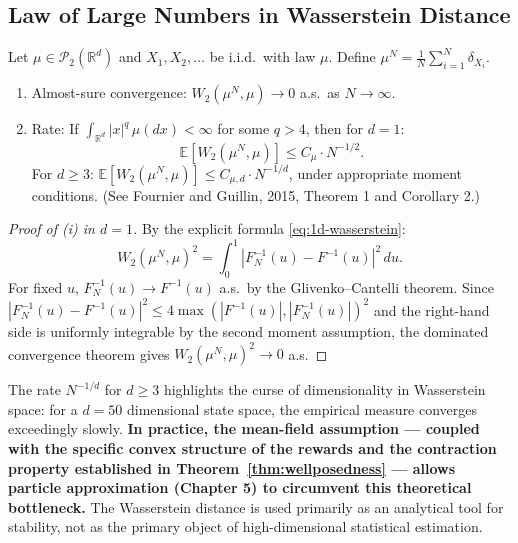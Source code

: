 \subsection{Law of Large Numbers in Wasserstein Distance}

\begin{theorem}
\label{thm:fournier-guillin}
Let $\mu \in \mathcal{P}_2(\mathbb{R}^d)$ and $X_1, X_2, \dots$ be i.i.d.\ with law
$\mu$. Define $\mu^N = \frac{1}{N}\sum_{i=1}^N \delta_{X_i}$.
\begin{enumerate}[label=(\roman*)]
    \item Almost-sure convergence: $W_2(\mu^N, \mu) \to 0$ a.s.\ as $N \to \infty$.
    \item Rate: If $\int_{\mathbb{R}^d} |x|^q\, \mu(dx) < \infty$ for some $q > 4$, then
    for $d=1$:
    \[
        \mathbb{E}[W_2(\mu^N,\mu)] \leq C_\mu \cdot N^{-1/2}.
    \]
    For $d \geq 3$: $\mathbb{E}[W_2(\mu^N,\mu)] \leq C_{\mu,d} \cdot N^{-1/d}$, under
    appropriate moment conditions. (See Fournier and Guillin, 2015, Theorem 1 and
    Corollary 2.)
\end{enumerate}
\end{theorem}

\begin{proof}[Proof of (i) in $d=1$]
By the explicit formula \eqref{eq:1d-wasserstein}:
\[
    W_2(\mu^N,\mu)^2 = \int_0^1 |F_N^{-1}(u) - F^{-1}(u)|^2\, du.
\]
For fixed $u$, $F_N^{-1}(u) \to F^{-1}(u)$ a.s.\ by the Glivenko--Cantelli theorem.
Since $|F_N^{-1}(u) - F^{-1}(u)|^2 \leq 4\max(|F^{-1}(u)|, |F_N^{-1}(u)|)^2$ and the
right-hand side is uniformly integrable by the second moment assumption, the dominated
convergence theorem gives $W_2(\mu^N,\mu)^2 \to 0$ a.s.
\end{proof}

\begin{remark}
The rate $N^{-1/d}$ for $d \geq 3$ highlights the curse of dimensionality in
Wasserstein space: for a $d=50$ dimensional state space, the empirical measure converges
exceedingly slowly. \textbf{In practice, the mean-field assumption --- coupled with the
specific convex structure of the rewards and the contraction property established in
Theorem~\ref{thm:wellposedness} --- allows particle approximation (Chapter 5) to circumvent this
theoretical bottleneck.} The Wasserstein distance is used primarily as an analytical
tool for stability, not as the primary object of high-dimensional statistical
estimation.
\end{remark}

